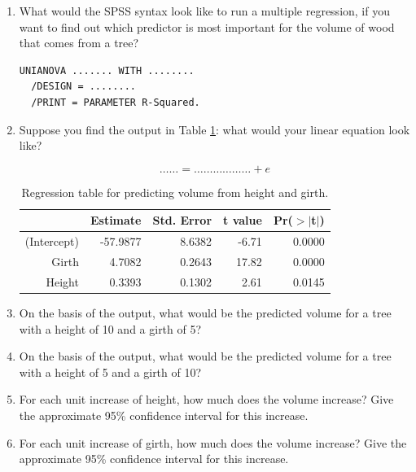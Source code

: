 \documentclass[]{report}\usepackage[]{graphicx}\usepackage[]{color}
\begin{document}
\begin{enumerate}
\item What would the SPSS syntax look like to run a multiple regression, if you want to find out which predictor is most important for the volume of wood that comes from a tree?


\begin{verbatim}
UNIANOVA ....... WITH ........
  /DESIGN = ........
  /PRINT = PARAMETER R-Squared.
\end{verbatim}


\item Suppose you find the output in Table \ref{tab:multi_5}: what would your linear equation look like?

\begin{equation}
\dots \dots = \dots    \dots   \dots \dots \dots \dots+ e
\end{equation}


\begin{table}[ht]
\centering
\caption{Regression table for predicting volume from height and girth.} 
\label{tab:multi_5}
\begin{tabular}{rrrrr}
  \hline
 & Estimate & Std. Error & t value & Pr($>$$|$t$|$) \\ 
  \hline
(Intercept) & -57.9877 & 8.6382 & -6.71 & 0.0000 \\ 
  Girth & 4.7082 & 0.2643 & 17.82 & 0.0000 \\ 
  Height & 0.3393 & 0.1302 & 2.61 & 0.0145 \\ 
   \hline
\end{tabular}
\end{table}





\item On the basis of the output, what would be the predicted volume for a tree with a height of 10 and a girth of 5?

\item On the basis of the output, what would be the predicted volume for a tree with a height of 5 and a girth of 10?

\item For each unit increase of height, how much does the volume increase? Give the approximate 95\% confidence interval for this increase.

\item For each unit increase of girth, how much does the volume increase? Give the approximate 95\% confidence interval for this increase.



\end{enumerate}
\end{document}
